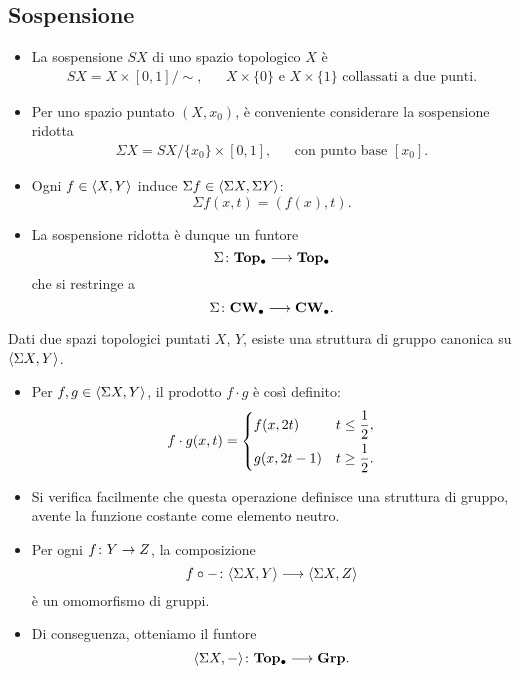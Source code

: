\subsection*{Sospensione}
\begin{frame*}
\begin{itemize}
\item La sospensione $SX$ di uno spazio topologico $X$ è
\begin{align*}
SX=X\times[0,1]/\sim,&&\text{$X\times\{0\}$ e $X\times\{1\}$ collassati a due punti.}
\end{align*}
\item Per uno spazio puntato $(X,x_0)$, è conveniente considerare la sospensione ridotta
\begin{align*}
\Sigma X=SX/\{x_0\}\times[0,1],&&\text{con punto base $[x_0]$.}
\end{align*}
\item Ogni $f\in\langle X,Y\rangle$ induce $\Sigma f\in\langle \Sigma X,\Sigma Y\rangle$:
\[
\Sigma f(x,t)=(f(x),t).
\]
\item La sospensione ridotta è dunque un funtore
\[
\map{\Sigma}{\Top0}{\Top0}
\]
che si restringe a
\[
\map{\Sigma}{\CW0}{\CW0}.
\]
\end{itemize}
\end{frame*}

\begin{frame*}
Dati due spazi topologici puntati $X$, $Y$, esiste una struttura di gruppo canonica su $\langle \Sigma X,Y\rangle$.
\begin{itemize}
\item Per $f,g\in\langle \Sigma X,Y\rangle$, il prodotto $f\cdot g$ è così definito:
\[
f\cdot g(x,t)=\begin{dcases}f(x,2t)&t\le\frac{1}{2},\\g(x,2t-1)&t\ge\frac{1}{2}.\end{dcases}
\]
\item Si verifica facilmente che questa operazione definisce una struttura di gruppo, avente la funzione costante come elemento neutro.
\item Per ogni $\map{f}{Y}{Z}$, la composizione
\[
\map{f\circ-{}}{\hmaps{\Sigma X,Y}}{\hmaps{\Sigma X,Z}}
\]
 è un omomorfismo di gruppi.
 \item Di conseguenza, otteniamo il funtore
 \[
 \map{\hmaps{\Sigma X,-}}{\Top0}{\Grp}.
 \]
\end{itemize}
\end{frame*}

